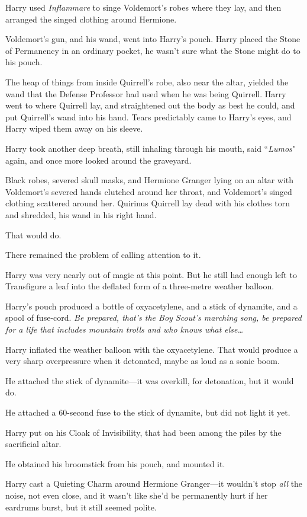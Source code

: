 Harry used \emph{Inflammare} to singe Voldemort's robes where they lay, and then arranged the singed clothing around Hermione.

Voldemort's gun, and his wand, went into Harry's pouch. Harry placed the Stone of Permanency in an ordinary pocket, he wasn't sure what the Stone might do to his pouch.

The heap of things from inside Quirrell's robe, also near the altar, yielded the wand that the Defense Professor had used when he was being Quirrell. Harry went to where Quirrell lay, and straightened out the body as best he could, and put Quirrell's wand into his hand. Tears predictably came to Harry's eyes, and Harry wiped them away on his sleeve.

Harry took another deep breath, still inhaling through his mouth, said ``\emph{Lumos}" again, and once more looked around the graveyard.

Black robes, severed skull masks, and Hermione Granger lying on an altar with Voldemort's severed hands clutched around her throat, and Voldemort's singed clothing scattered around her. Quirinus Quirrell lay dead with his clothes torn and shredded, his wand in his right hand.

That would do.

There remained the problem of calling attention to it.

Harry was very nearly out of magic at this point. But he still had enough left to Transfigure a leaf into the deflated form of a three-metre weather balloon.

Harry's pouch produced a bottle of oxyacetylene, and a stick of dynamite, and a spool of fuse-cord. \emph{Be prepared, that's the Boy Scout's marching song, be prepared for a life that includes mountain trolls and who knows what else{\ldots}}

Harry inflated the weather balloon with the oxyacetylene. That would produce a very sharp overpressure when it detonated, maybe as loud as a sonic boom.

He attached the stick of dynamite—it was overkill, for detonation, but it would do.

He attached a 60-second fuse to the stick of dynamite, but did not light it yet.

Harry put on his Cloak of Invisibility, that had been among the piles by the sacrificial altar.

He obtained his broomstick from his pouch, and mounted it.

Harry cast a Quieting Charm around Hermione Granger—it wouldn't stop \emph{all} the noise, not even close, and it wasn't like she'd be permanently hurt if her eardrums burst, but it still seemed polite.

